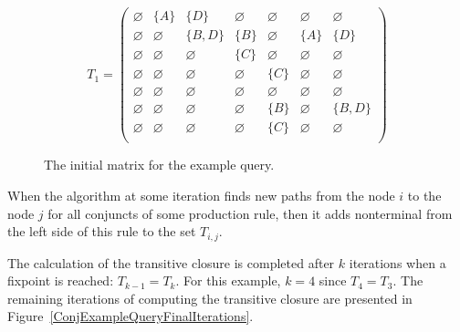 \begin{figure}[h]
	\[
	T_1 = \begin{pmatrix}
	\varnothing & \{A\} & \{D\} & \varnothing & \varnothing & \varnothing & \varnothing \\
	
	\varnothing & \varnothing & \{B, D\} & \{B\} & \varnothing & \{A\} & \{D\} \\
	
	\varnothing & \varnothing & \varnothing & \{C\} & \varnothing & \varnothing & \varnothing \\
	
	\varnothing & \varnothing & \varnothing & \varnothing & \{C\} & \varnothing & \varnothing \\
	
	\varnothing & \varnothing & \varnothing & \varnothing & \varnothing & \varnothing & \varnothing \\
	
	\varnothing & \varnothing & \varnothing & \varnothing & \{B\} & \varnothing & \{B, D\} \\
	
	\varnothing & \varnothing & \varnothing & \varnothing & \{C\} & \varnothing & \varnothing \\
	\end{pmatrix}
	\]
	\caption{The initial matrix for the example query.}
	\label{ConjExampleQueryFirstIteration}
\end{figure}

When the algorithm at some iteration finds new paths from the node $i$ to the node $j$ for all conjuncts of some production rule, then it adds nonterminal from the left side of this rule to the set $T_{i,j}$.

The calculation of the transitive closure is completed after $k$ iterations when a fixpoint is reached: $T_{k-1} = T_k$. For this example, $k = 4$ since $T_4 = T_3$. The remaining iterations of computing the transitive closure are presented in Figure~\ref{ConjExampleQueryFinalIterations}.

